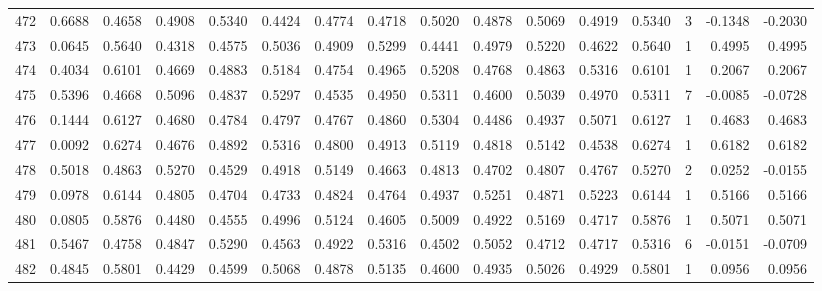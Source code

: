 \begin{tabular}{lrrrrrrrrrrrrrrr}
472 &      0.6688 &  0.4658 &  0.4908 &  0.5340 &  0.4424 &  0.4774 &  0.4718 &  0.5020 &  0.4878 &  0.5069 &   0.4919 &     0.5340 &      3 &                   -0.1348 &                    -0.2030 \\
473 &      0.0645 &  0.5640 &  0.4318 &  0.4575 &  0.5036 &  0.4909 &  0.5299 &  0.4441 &  0.4979 &  0.5220 &   0.4622 &     0.5640 &      1 &                    0.4995 &                     0.4995 \\
474 &      0.4034 &  0.6101 &  0.4669 &  0.4883 &  0.5184 &  0.4754 &  0.4965 &  0.5208 &  0.4768 &  0.4863 &   0.5316 &     0.6101 &      1 &                    0.2067 &                     0.2067 \\
475 &      0.5396 &  0.4668 &  0.5096 &  0.4837 &  0.5297 &  0.4535 &  0.4950 &  0.5311 &  0.4600 &  0.5039 &   0.4970 &     0.5311 &      7 &                   -0.0085 &                    -0.0728 \\
476 &      0.1444 &  0.6127 &  0.4680 &  0.4784 &  0.4797 &  0.4767 &  0.4860 &  0.5304 &  0.4486 &  0.4937 &   0.5071 &     0.6127 &      1 &                    0.4683 &                     0.4683 \\
477 &      0.0092 &  0.6274 &  0.4676 &  0.4892 &  0.5316 &  0.4800 &  0.4913 &  0.5119 &  0.4818 &  0.5142 &   0.4538 &     0.6274 &      1 &                    0.6182 &                     0.6182 \\
478 &      0.5018 &  0.4863 &  0.5270 &  0.4529 &  0.4918 &  0.5149 &  0.4663 &  0.4813 &  0.4702 &  0.4807 &   0.4767 &     0.5270 &      2 &                    0.0252 &                    -0.0155 \\
479 &      0.0978 &  0.6144 &  0.4805 &  0.4704 &  0.4733 &  0.4824 &  0.4764 &  0.4937 &  0.5251 &  0.4871 &   0.5223 &     0.6144 &      1 &                    0.5166 &                     0.5166 \\
480 &      0.0805 &  0.5876 &  0.4480 &  0.4555 &  0.4996 &  0.5124 &  0.4605 &  0.5009 &  0.4922 &  0.5169 &   0.4717 &     0.5876 &      1 &                    0.5071 &                     0.5071 \\
481 &      0.5467 &  0.4758 &  0.4847 &  0.5290 &  0.4563 &  0.4922 &  0.5316 &  0.4502 &  0.5052 &  0.4712 &   0.4717 &     0.5316 &      6 &                   -0.0151 &                    -0.0709 \\
482 &      0.4845 &  0.5801 &  0.4429 &  0.4599 &  0.5068 &  0.4878 &  0.5135 &  0.4600 &  0.4935 &  0.5026 &   0.4929 &     0.5801 &      1 &                    0.0956 &                     0.0956 \\

\end{tabular}
